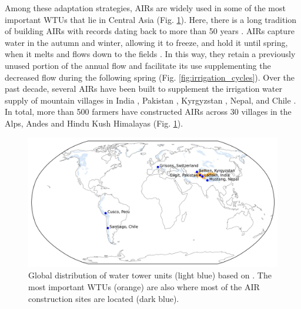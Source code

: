 Among these adaptation strategies, \ac{AIRs} are widely used in some of the most important \ac{WTUs} that lie in
Central Asia (Fig. \ref{fig:WTUs_AIRs}). Here, there is a long tradition of building \ac{AIRs} with records
dating back to more than 50 years \citep{nusserSociohydrologyArtificialGlaciers2019}. \ac{AIRs} capture water in
the autumn and winter, allowing it to freeze, and hold it until spring, when it melts and flows down to the
fields \citep{ipccChapterHighMountain2019, vinceGlacierMan2009, clouseLadakhArtificialGlaciers2017,
	nusserSociohydrologyArtificialGlaciers2019}. In this way, they retain a previously unused portion of the annual
flow and facilitate its use supplementing the decreased flow during the following spring (Fig.
\ref{fig:irrigation_cycles}). Over the past decade, several \ac{AIRs} have been built to supplement the
irrigation water supply of mountain villages in India \citep{wangchukIceStupaCompetition2020,
	palmerStoringFrozenWater2022, aggarwalAdaptationClimateChange2021}, Pakistan
\citep{awazproductionIceStupaArtificial2022}, Kyrgyzstan \citep{bbcnewsBrightArtificialGlacier2020}, Nepal, and
Chile \citep{reutersConservationistsChileAim2021}. In total, more than 500 farmers have constructed AIRs across
30 villages in the Alps, Andes and Hindu Kush Himalayas (Fig. \ref{fig:WTUs_AIRs}).

\begin{figure}[htb]
	\centering
	\includegraphics[width=\textwidth]{figs/WTUs_AIRs.jpg}

	\caption{ Global distribution of water tower units (light blue) based on
		\cite{immerzeelImportanceVulnerabilityWorld2020}. The most important \ac{WTUs} (orange) are also where most of
		the AIR construction sites  are located (dark blue). }

	\label{fig:WTUs_AIRs}
\end{figure}

